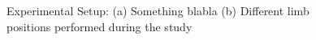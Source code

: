 	
	
\begin{figure}[htb]
	\centering
	\caption{Experimental Setup: (a) Something blabla (b) Different limb positions performed during the study} \label{fig:setup}
\end{figure}%
